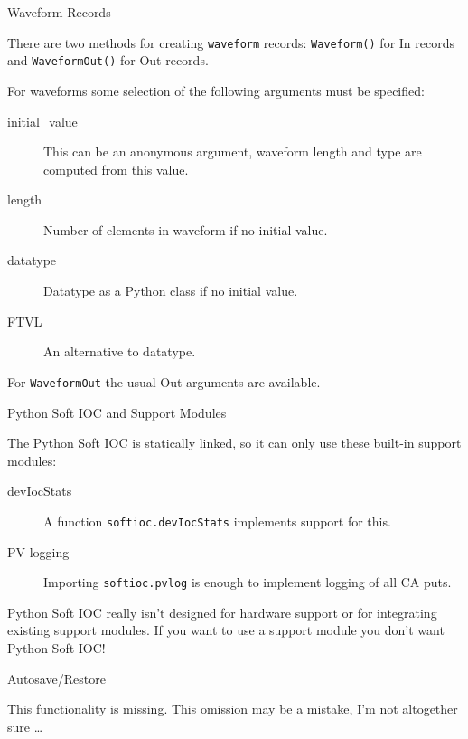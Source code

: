 \documentclass{beamer}
\begin{document}
%
\begin{frame}{Waveform Records}

There are two methods for creating \texttt{waveform} records:
\texttt{Waveform()} for In records and \texttt{WaveformOut()} for Out records.

\medskip

For waveforms some selection of the following arguments must be specified:

\begin{description}
\item[initial\_value]
This can be an anonymous argument, waveform length and type are computed
from this value.
\item[length] Number of elements in waveform if no initial value.
\item[datatype] Datatype as a Python class if no initial value.
\item[FTVL] An alternative to datatype.
\end{description}

\medskip

For \texttt{WaveformOut} the usual Out arguments are available.

\end{frame}


%
\begin{frame}{Python Soft IOC and Support Modules}

The Python Soft IOC is statically linked, so it can only use these built-in
support modules:

\begin{description}
\item[devIocStats]
A function \texttt{softioc.devIocStats} implements support for this.
\item[PV logging]
Importing \texttt{softioc.pvlog} is enough to implement logging of all CA puts.
\end{description}

\medskip

Python Soft IOC really isn't designed for hardware support or for integrating
existing support modules.  If you want to use a support module you don't want
Python Soft IOC!

\end{frame}


%
\begin{frame}{Autosave/Restore}

This functionality is missing.  This omission may be a mistake, I'm not
altogether sure \dots

\end{frame}
\end{document}
